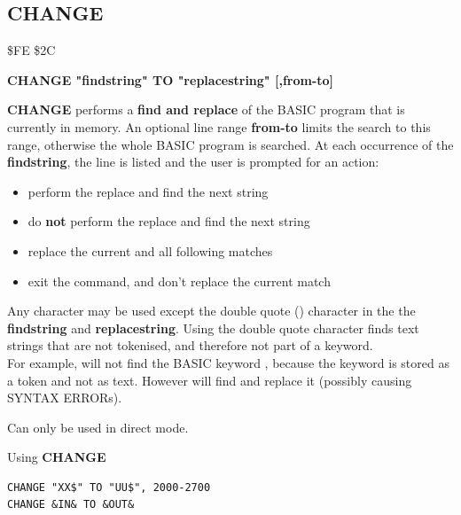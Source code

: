 \newpage
\subsection{CHANGE}
\begin{description}[leftmargin=2cm,style=nextline]
\item [Token:] \$FE \$2C
\item [Format:] {\bf CHANGE "findstring" TO "replacestring" [,from-to]}
\item [Usage:]  {\bf CHANGE} performs a {\bf find and replace} of the BASIC program
                that is currently in memory.
   An optional line range {\bf from-to} limits the search to this range,
   otherwise the whole BASIC program is searched.
   At each oc\-cur\-rence of the {\bf findstring}, the line is
   listed and the user is prompted for an action:
    \begin{itemize}
      \item {}  perform the replace and find the next string
      \item {}  do {\bf not} perform the replace and find the next string
      \item \megakey{*}  replace the current and all following matches
      \item {} exit the command, and don't replace the current match
    \end{itemize}
\item [Remarks:] Any character may be used except the
   double quote () character in the
   the {\bf findstring} and {\bf replacestring}.
   Using the double quote character finds text strings that are
   not tokenised, and therefore not part of a keyword. \\
   For example,  will not find
   the BASIC keyword , because the
   keyword is stored as a token and not as text.
   However  will
   find and replace it (possibly causing SYNTAX ERRORs).

   Can only be used in direct mode.

\item [Examples:] Using {\bf CHANGE}
\begin{tcolorbox}[colback=black,coltext=white]
\verbatimfont{\codefont}
\begin{verbatim}
CHANGE "XX$" TO "UU$", 2000-2700
CHANGE &IN& TO &OUT&
\end{verbatim}
\end{tcolorbox}
\end{description}

